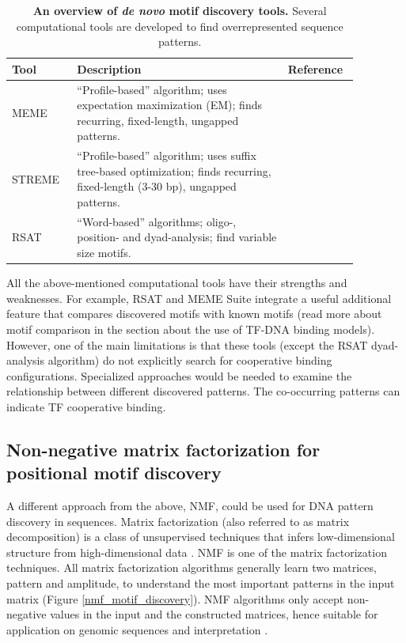     \begin{table}[htbp]
      \centering
      \caption[An overview of \textit{de novo} motif discovery tools]{\textbf{An overview of \textit{de novo} motif discovery tools.} Several computational tools are developed to find overrepresented sequence patterns.}
      \label{de_novo_tools}
      \begin{tabular}{p{0.175\linewidth} p{0.55\linewidth} p{0.14\linewidth}}
          \toprule
          \textbf{Tool}
          & 
          \textbf{Description}
          &
          \textbf{Reference}
          \\
          \midrule
          MEME
          & 
          ``Profile-based'' algorithm; uses expectation maximization (EM); finds recurring, fixed-length, ungapped patterns.
          &
          \cite{bailey1994fitting}
          \\[0.3ex]
          STREME
          &
          ``Profile-based'' algorithm; uses suffix tree-based optimization; finds recurring, fixed-length (3-30 bp), ungapped patterns.
          &
          \cite{bailey2021streme}
          \\[0.3ex]
          RSAT
          &
          ``Word-based'' algorithms; oligo-, position- and dyad-analysis; find variable size motifs.
          &
          \cite{thomas2011rsat,thomas2012rsat,santana2022rsat}
          \\
          \bottomrule
      \end{tabular}
  \end{table}

    All the above-mentioned computational tools have their strengths and weaknesses. For example, RSAT and MEME Suite integrate a useful additional feature that compares discovered motifs with known motifs (read more about motif comparison in the section about the use of TF-DNA binding models). However, one of the main limitations is that these tools (except the RSAT dyad-analysis algorithm) do not explicitly search for cooperative binding configurations. Specialized approaches would be needed to examine the relationship between different discovered patterns. The co-occurring patterns can indicate TF cooperative binding.

    \subsection{Non-negative matrix factorization for positional motif discovery}

    A different approach from the above, \ac{NMF}, could be used for DNA pattern discovery in sequences. Matrix factorization (also referred to as matrix decomposition) is a class of unsupervised techniques that infers low-dimensional structure from high-dimensional data \cite{stein2018enter}. NMF is one of the matrix factorization techniques. All matrix factorization algorithms generally learn two matrices, pattern and amplitude, to understand the most important patterns in the input matrix ({Figure \ref{nmf_motif_discovery}}). NMF algorithms only accept non-negative values in the input and the constructed matrices, hence suitable for application on genomic sequences and interpretation \cite{stein2018enter}.


